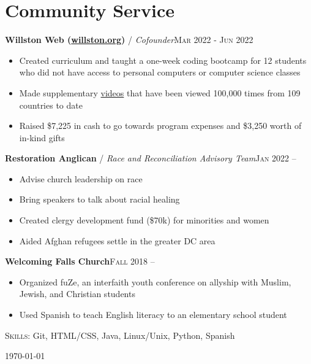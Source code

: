 \documentclass[12pt, a4paper]{article}
\begin{document}
\vspace{-8mm}
\section*{Community Service}
\vspace{-2mm}

\textbf{Willston Web (\href{https://willston.org}{willston.org})} / \textit{Cofounder}\hfill\textsc{Mar 2022 - Jun 2022}\\
\begin{itemize}
    \vspace{-8mm}
    \item Created curriculum and taught a one-week coding bootcamp for 12 students who did not have access to personal computers or computer science classes
    \item Made supplementary \href{https://youtube.com/JonathanBuchh}{videos} that have been viewed 100,000 times from 109 countries to date
    \item Raised \$7,225 in cash to go towards program expenses and \$3,250 worth of in-kind gifts
\end{itemize}

\textbf{Restoration Anglican} / \textit{Race and Reconciliation Advisory Team}\hfill\textsc{Jan 2022 --}\\
\begin{itemize}
    \vspace{-8mm}
    \item Advise church leadership on race
    \item Bring speakers to talk about racial healing
    \item Created clergy development fund (\$70k) for minorities and women
    \item Aided Afghan refugees settle in the greater DC area
\end{itemize}

\textbf{Welcoming Falls Church}\hfill\textsc{Fall 2018 --}\\
\begin{itemize}
    \vspace{-8mm}
    \item Organized fuZe, an interfaith youth conference on allyship with Muslim, Jewish, and Christian students
    \item Used Spanish to teach English literacy to an elementary school student
\end{itemize}

\vspace{-2mm}
\textsc{Skills}: Git, HTML/CSS, Java, Linux/Unix, Python, Spanish\\

\vspace{-6mm}
\begin{center}
{\scriptsize\today\- }
\end{center}
\end{document}
